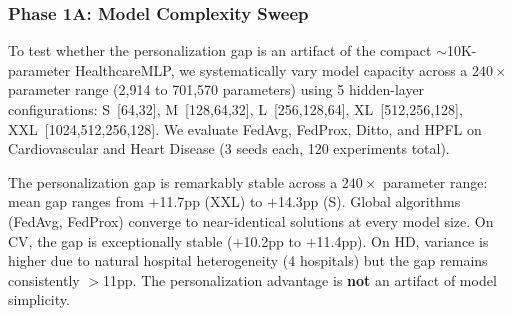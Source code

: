 \documentclass[conference]{IEEEtran}
\begin{document}
\subsubsection{Phase 1A: Model Complexity Sweep}
\label{sec:phase1a}

To test whether the personalization gap is an artifact of the compact $\sim$10K-parameter HealthcareMLP, we systematically vary model capacity across a $240\times$ parameter range (2,914 to 701,570 parameters) using 5 hidden-layer configurations: S~[64,32], M~[128,64,32], L~[256,128,64], XL~[512,256,128], XXL~[1024,512,256,128]. We evaluate FedAvg, FedProx, Ditto, and HPFL on Cardiovascular and Heart Disease (3 seeds each, 120 experiments total).

\begin{table}[htbp]
\centering
\caption{Model Complexity Sweep: Accuracy (\%) across $240\times$ parameter range. Mean over 3 seeds. Gap = mean(Ditto, HPFL) $-$ mean(FedAvg, FedProx).}
\label{tab:model_complexity}
\par{\footnotesize The personalization gap is remarkably stable across a $240\times$ parameter range: mean gap ranges from $+$11.7pp (XXL) to $+$14.3pp (S). Global algorithms (FedAvg, FedProx) converge to near-identical solutions at every model size. On CV, the gap is exceptionally stable ($+$10.2pp to $+$11.4pp). On HD, variance is higher due to natural hospital heterogeneity (4 hospitals) but the gap remains consistently $>$11pp. The personalization advantage is \textbf{not} an artifact of model simplicity.}
\end{table}
\end{document}
